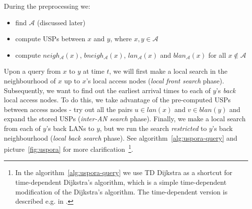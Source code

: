 \documentclass{svk_long_en}
\begin{document}
		During the preprocessing we:
		\begin{itemize}
			\item find $\mathcal{A}$ (discussed later)
			\item compute USPs between $x$ and $y$, where $x, y \in \mathcal{A}$ 
			\item compute $neigh_{\mathcal{A}}(x)$, $bneigh_{\mathcal{A}}(x)$, $lan_{\mathcal{A}}(x)$ and $blan_{\mathcal{A}}(x)$ for all $x \not \in \mathcal{A}$
		\end{itemize}
		\hspace{\fill}
		
		Upon a query from $x$ to $y$ at time $t$, we will first make a local search in the neighbourhood of $x$ up to $x$'s local access nodes (\textit{local front search} phase). Subsequently, we want to find out the earliest arrival times to each of $y$'s \textit{back} local access nodes. To do this, we take advantage of the pre-computed USPs between access nodes - try out all the pairs $u \in lan(x)$ and $v \in blan(y)$ and expand the stored USPs (\textit{inter-AN search} phase). Finally, we make a local search from each of $y$'s back LANs to $y$, but we run the search \textit{restricted} to $y$'s back neighbourhood (\textit{local back search} phase). See algorithm~\ref{alg:uspora-query} and picture~\ref{fig:uspora} for more clarification~\footnote{In the algorithm~\ref{alg:uspora-query} we use TD Dijkstra as a shortcut for time-dependent Dijkstra's algorithm, which is a simple time-dependent modification of the Dijkstra's algorithm. The time-dependent version is described e.g. in \cite{tdroute09}.}.
		
\end{document}
